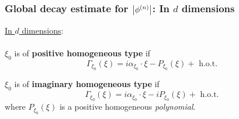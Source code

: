 \documentclass{beamer}
\theoremstyle{definition}
\begin{document}
%





\begin{frame}
\frametitle{Global decay estimate for $\abs{\phi^{(n)}}$: In $d$ dimensions}
\underline{In $d$ dimensions}:\\
$\,$\\

$\xi_0$ is of \textbf{positive homogeneous type} if
\begin{equation*}
\Gamma_{\xi_0}(\xi) = i\alpha_{\xi_0}\cdot\xi - P_{\xi_0}(\xi) + \text{ h.o.t.}
\end{equation*}


$\xi_0$ is of \textbf{imaginary homogeneous type} if
\begin{equation*}
\Gamma_{\xi_0}(\xi) = i\alpha_{\xi_0}\cdot \xi - iP_{\xi_0}(\xi)  + \text{ h.o.t.}
\end{equation*}
where $P_{\xi_0}(\xi)$ is a positive homogeneous \textit{polynomial}.


\end{frame}
\end{document}
